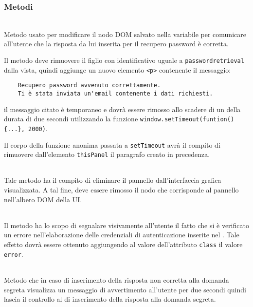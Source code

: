 \subsubsection*{Metodi}
\begin{description}

  \item{}\\
	Metodo usato per modificare il nodo DOM salvato nella variabile  per comunicare all'utente che la risposta da lui inserita per il recupero password è corretta. 
	
Il metodo deve rimuovere il figlio con identificativo uguale a \texttt{passwordretrieval} dalla vista, quindi aggiunge un nuovo elemento \verb'<p>' contenente il messaggio:
\begin{verbatim}
	Recupero password avvenuto correttamente.
	Ti è stata inviata un'email contenente i dati richiesti.
\end{verbatim}
il messaggio citato è temporaneo e dovrà essere rimosso allo scadere di un  della durata di due secondi utilizzando la funzione \verb'window.setTimeout(funtion() {...}, 2000)'.

Il corpo della funzione anonima passata a \verb'setTimeout' avrà il compito di rimuovere dall'elemento \verb'thisPanel' il paragrafo creato in precedenza.

  \item{}\\
  Tale metodo ha il compito di eliminare il pannello dall'interfaccia grafica visualizzata. A tal fine, deve essere rimosso il nodo che corrisponde al pannello nell'albero DOM della UI\@.
  
  \item{}\\
  Il metodo ha lo scopo di segnalare visivamente all'utente il fatto che si è verificato un errore nell'elaborazione delle credenziali di autenticazione inserite nel . Tale effetto dovrà essere ottenuto aggiungendo al valore dell'attributo \verb+class+ il valore \verb+error+.

	\item{}\\
	Metodo che in caso di inserimento della risposta non corretta alla domanda segreta visualizza un messaggio di avvertimento all'utente per due secondi quindi lascia il controllo al  di inserimento della risposta alla domanda segreta.
	

\end{description}
